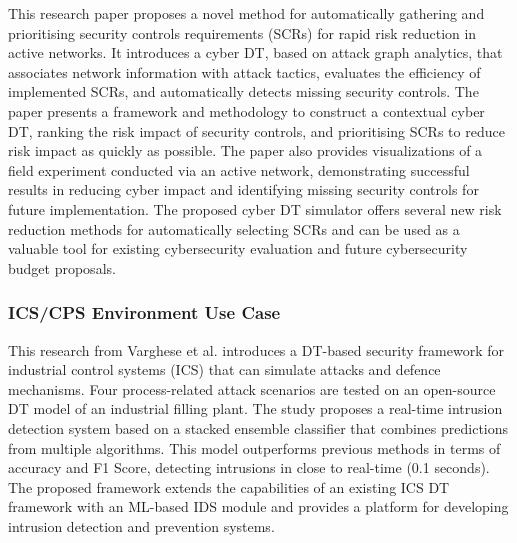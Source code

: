 This\cite{hadarCyberDigitalTwin2020} research paper proposes a novel method for automatically gathering and prioritising security controls requirements (SCRs) for rapid risk reduction in active networks. It introduces a cyber DT, based on attack graph analytics, that associates network information with attack tactics, evaluates the efficiency of implemented SCRs, and automatically detects missing security controls. The paper presents a framework and methodology to construct a contextual cyber DT, ranking the risk impact of security controls, and prioritising SCRs to reduce risk impact as quickly as possible. The paper also provides visualizations of a field experiment conducted via an active network, demonstrating successful results in reducing cyber impact and identifying missing security controls for future implementation. The proposed cyber DT simulator offers several new risk reduction methods for automatically selecting SCRs and can be used as a valuable tool for existing cybersecurity evaluation and future cybersecurity budget proposals.

\subsubsection*{ICS/CPS Environment Use Case}

This\cite{vargheseDigitalTwinbasedIntrusion2022} research from Varghese et al. introduces a DT-based security framework for industrial control systems (ICS) that can simulate attacks and defence mechanisms. Four process-related attack scenarios are tested on an open-source DT model of an industrial filling plant. The study proposes a real-time intrusion detection system based on a stacked ensemble classifier that combines predictions from multiple algorithms. This model outperforms previous methods in terms of accuracy and F1 Score, detecting intrusions in close to real-time (0.1 seconds). The proposed framework extends the capabilities of an existing ICS DT framework with an ML-based IDS module and provides a platform for developing intrusion detection and prevention systems.


